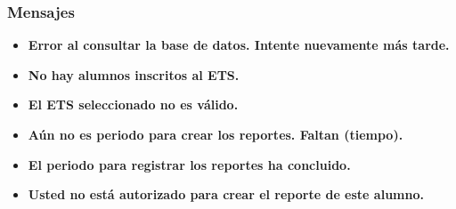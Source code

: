 \subsubsection{Mensajes}
\begin{itemize}
	\item \textbf{Error al consultar la base de datos. Intente nuevamente más tarde.}
	\item \textbf{No hay alumnos inscritos al ETS.}
	\item \textbf{El ETS seleccionado no es válido.}
	\item \textbf{Aún no es periodo para crear los reportes. Faltan (tiempo).}
	\item \textbf{El periodo para registrar los reportes ha concluido.}
	\item \textbf{Usted no está autorizado para crear el reporte de este alumno.}
\end{itemize}